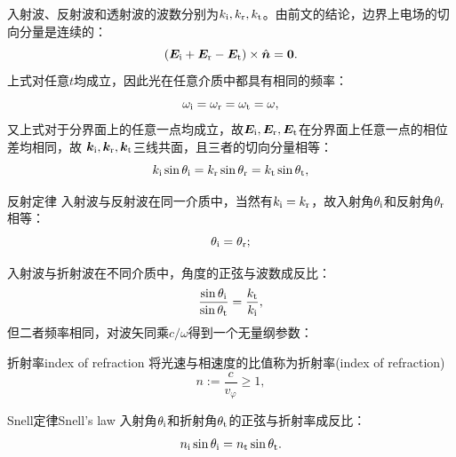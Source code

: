 入射波、反射波和透射波的波数分别为$k_{\mathrm{i}},k_\text r,k_\text t$。由前文的结论，边界上电场的切向分量是连续的：
\[
    (\bm E_{\mathrm{i}}+\bm E_\text r-\bm E_\text t)\times\mathop{}\!\hat{\bm{n}}=\bm 0.
\]
上式对任意$t$均成立，因此光在任意介质中都具有相同的频率：
\begin{equation}
    \label{eqn:omegai=omegar=omegat}
    \omega_{\mathrm{i}}=\omega_\text r=\omega_\text t=\omega,
\end{equation}
又上式对于分界面上的任意一点均成立，故$\bm E_{\mathrm{i}},\bm E_\text r,\bm E_\text t$在分界面上任意一点的相位差均相同，故
$\bm k_{\mathrm{i}},\bm k_\text r,\bm k_\text t$三线共面，且三者的切向分量相等：
\begin{equation}
    k_{\mathrm{i}}\sin\theta_{\mathrm{i}}=k_\text r\sin\theta_\text r=k_\text t\sin\theta_\text t,
\end{equation}

\begin{theorem}{反射定律}{}
    入射波与反射波在同一介质中，当然有$k_{\mathrm{i}}=k_\text r$，故入射角$\theta_{\mathrm{i}}$和反射角$\theta_\text r$相等：
    \begin{equation}
        \theta_{\mathrm{i}}=\theta_\text r;
    \end{equation}
\end{theorem}
入射波与折射波在不同介质中，角度的正弦与波数成反比：
\[
    \frac{\sin\theta_{\mathrm{i}}}{\sin\theta_\text t}=\frac{k_\text t}{k_{\mathrm{i}}},
\]
但二者频率相同，对波矢同乘$c/\omega$得到一个无量纲参数：
\begin{definition}
    {折射率}{index of refraction}
    将光速与相速度的比值称为折射率(index of refraction)
    \begin{equation}
        n:=\frac c{v_\varphi}\geqslant1,
    \end{equation}
\end{definition}
\begin{theorem}{Snell定律}{Snell's law}
    入射角$\theta_{\mathrm{i}}$和折射角$\theta_\text t$的正弦与折射率成反比：
    \begin{equation}
        \label{eqn:Snell}
        n_{\mathrm{i}}\sin\theta_{\mathrm{i}}=n_\text t\sin\theta_\text t.
    \end{equation}
\end{theorem}

